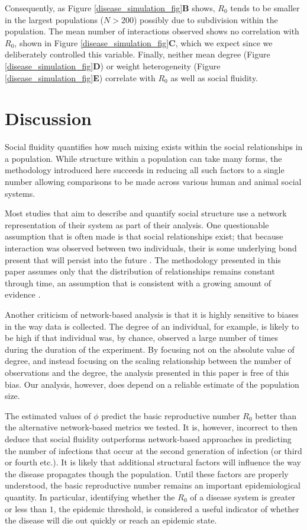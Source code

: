 \documentclass[10pt]{article}
\begin{document}
\begin{multicols}{2}
Consequently, as Figure \ref{disease_simulation_fig}\textbf{B} shows, $R_{0}$ tends to be smaller in the largest populations ($N>200$) possibly due to subdivision within the population. The mean number of interactions observed shows no correlation with $R_{0}$, shown in Figure \ref{disease_simulation_fig}\textbf{C}, which we expect since we deliberately controlled this variable. Finally, neither mean degree (Figure \ref{disease_simulation_fig}\textbf{D}) or weight heterogeneity (Figure \ref{disease_simulation_fig}\textbf{E}) correlate with $R_{0}$ as well as social fluidity.

\section{Discussion}
Social fluidity quantifies how much mixing exists within the social relationships in a population. While structure within a population can take many forms, the methodology introduced here succeeds in reducing all such factors to a single number allowing comparisons to be made across various human and animal social systems. 

Most studies that aim to describe and quantify social structure use a network representation of their system as part of their analysis. One questionable assumption that is often made is that social relationships exist; that because interaction was observed between two individuals, their is some underlying bond present that will persist into the future \cite{perreault2010note}. The methodology presented in this paper assumes only that the distribution of relationships remains constant through time, an assumption that is consistent with a growing amount of evidence \cite{miritello2013limited,10.1371/journal.pone.0173110}. 

Another criticism of network-based analysis is that it is highly sensitive to biases in the way data is collected. The degree of an individual, for example, is likely to be high if that individual was, by chance, observed a large number of times during the duration of the experiment. By focusing not on the absolute value of degree, and instead focusing on the scaling relationship between the number of observations and the degree, the analysis presented in this paper is free of this bias. Our analysis, however, does depend on a reliable estimate of the population size. %

The estimated values of $\phi$ predict the basic reproductive number $R_{0}$ better than the alternative network-based metrics we tested. It is, however, incorrect to then deduce that social fluidity outperforms network-based approaches in predicting the number of infections that occur at the second generation of infection (or third or fourth etc.). It is likely that additional structural factors will influence the way the disease propagates though the population. Until these factors are properly understood, the basic reproductive number remains an important epidemiological quantity. In particular, identifying whether the $R_{0}$ of a disease system is greater or less than $1$, the epidemic threshold, is considered a useful indicator of whether the disease will die out quickly or reach an epidemic state.


\end{multicols}
\end{document}
